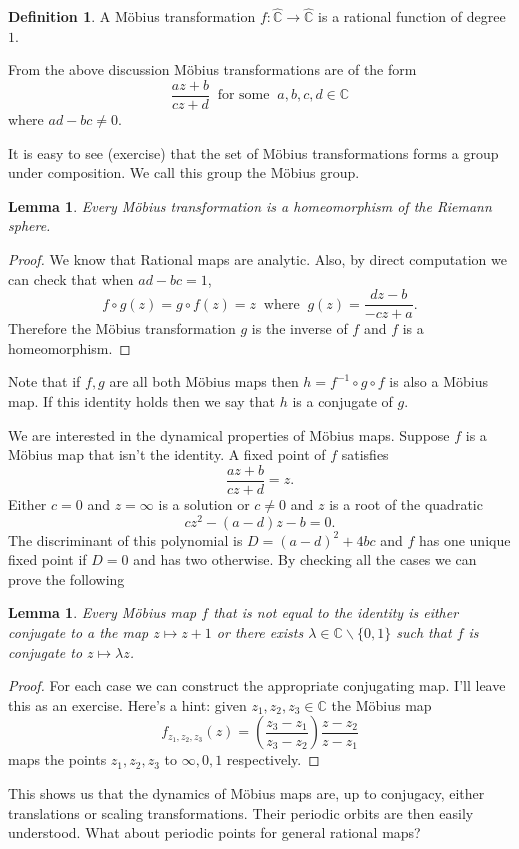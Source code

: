 \documentclass[12pt]{article}
\newtheorem{lemma}[theorem]{Lemma}
\theoremstyle{definition}
\newtheorem{definition}[theorem]{Definition}
\theoremstyle{remark}
\begin{document}
\begin{definition}
A M\"obius transformation $f: \widehat{\mathbb{C}} \to \widehat{\mathbb{C}}$ is a rational function of degree $1$.
\end{definition} 

From the above discussion M\"obius transformations are of the form
\[
\frac{az + b}{cz + d} \ \text{ for some } \ a,b,c,d \in \mathbb{C}
\]
where $ad - bc \neq 0$.

It is easy to see (exercise) that the set of M\"obius transformations forms a group under composition. We call this group the M\"obius group. 

\begin{lemma}
Every M\"obius transformation is a homeomorphism of the Riemann sphere.
\end{lemma} 
\begin{proof}
We know that Rational maps are analytic. Also, by direct computation we can check that when $ad - bc =1$,
\[
f \circ g (z) = g \circ f(z) = z \ \text{ where } \ g(z) = \frac{dz - b}{-cz +a}.
\]
Therefore the M\"obius transformation $g$ is the inverse of $f$ and $f$ is a homeomorphism.
\end{proof}
Note that if $f,g$ are all both M\"obius maps then $h = f^{-1}\circ g \circ f$ is also a M\"obius map. If this identity holds then we say that $h$ is a conjugate of $g$.

We are interested in the dynamical properties of M\"obius maps. Suppose $f$ is a M\"obius map that isn't the identity.
A fixed point of $f$ satisfies
\[
\frac{az + b}{cz + d} = z.
\]
Either $c = 0$ and $z = \infty$ is a solution or $c \neq 0$ and $z$ is a root of the quadratic
\[
cz^2 -(a-d)z - b = 0.
\]
The discriminant of this polynomial is  $D = (a-d)^2 +4bc$ and $f$ has one unique fixed point if $D =0$ and has two otherwise.
By checking all the cases we can prove the following

\begin{lemma}
Every M\"obius map $f$ that is not equal to the identity is either conjugate to a the map $z \mapsto z + 1$ or there exists $\lambda \in \mathbb{C} \backslash \{0,1\}$ such that $f$ is conjugate  to $z \mapsto \lambda z$.
\end{lemma}

\begin{proof}
For each case we can construct the appropriate conjugating map. I'll leave this as an exercise.
Here's a hint: given $z_1, z_2, z_3 \in \mathbb{C}$ the M\"obius map
\[
f_{z_1,z_2,z_3}(z) =  \left(\frac{z_3-z_1}{z_3 - z_2}\right) \frac{z-z_2}{z-z_1}
\]
maps the points $z_1, z_2, z_3$ to $\infty, 0, 1$ respectively.
\end{proof}
This shows us that the dynamics of M\"obius maps are, up to conjugacy, either translations or scaling transformations. Their periodic orbits are then easily understood. What about periodic points for general rational maps?
\end{document}
